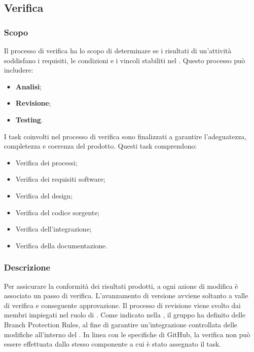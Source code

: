 \subsection{Verifica}\label{verifica}

\subsubsection{Scopo}
\par Il processo di verifica ha lo scopo di determinare se i risultati di un'attività soddisfano i requisiti, le condizioni e i vincoli stabiliti nel \PianoDiQualifica. Questo processo può includere:
\begin{itemize}
  \item \textbf{Analisi};
  \item \textbf{Revisione};
  \item \textbf{Testing}.
\end{itemize}

\vspace{0.5\baselineskip}
\par I task coinvolti nel processo di verifica sono finalizzati a garantire l'adeguatezza, completezza e coerenza del prodotto. Questi task comprendono:
\begin{itemize}
  \item Verifica dei processi;
  \item Verifica dei requisiti software;
  \item Verifica del design;
  \item Verifica del codice sorgente;
  \item Verifica dell'integrazione;
  \item Verifica della documentazione.
\end{itemize}

\subsubsection{Descrizione}
\par Per assicurare la conformità dei risultati prodotti, a ogni azione di modifica è associato un passo di verifica. L’avanzamento di versione avviene soltanto a valle di verifica e conseguente approvazione. Il processo di revisione viene svolto dai membri impiegati nel ruolo di \Verificatore. Come indicato nella , il gruppo ha definito delle Branch Protection Rules, al fine di garantire un'integrazione controllata delle modifiche all'interno del . In linea con le specifiche di GitHub, la verifica non può essere effettuata dallo stesso componente a cui è stato assegnato il task.

